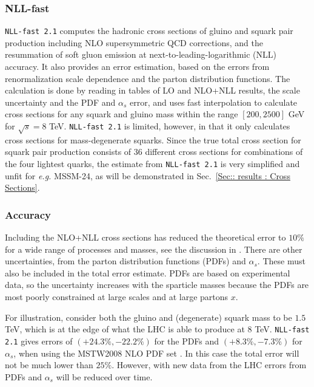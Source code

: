 \documentclass[twoside,english]{uiofysmaster}
\begin{document}
{\subsubsection{NLL-fast}

\verb|NLL-fast 2.1| \cite{beenakker1997squark, kulesza2009threshold, kulesza2009soft, beenakker2009soft, beenakker2011squark} computes the hadronic cross sections of gluino and squark pair production including NLO supersymmetric QCD corrections, and the resummation of soft gluon emission at next-to-leading-logarithmic (NLL) accuracy. It also provides an error estimation, based on the errors from renormalization scale dependence and the parton distribution functions. The calculation is done by reading in tables of LO and NLO+NLL results, the scale uncertainty and the PDF and $\alpha_s$ error, and uses fast interpolation to calculate cross sections for any squark and gluino mass within the range $[200, 2500]$ GeV for $\sqrt{s}=8$ TeV. \verb|NLL-fast 2.1| is limited, however, in that it only calculates cross sections for mass-degenerate squarks. Since the true total cross section for squark pair production consists of 36 different cross sections for combinations of the four lightest quarks, the estimate from \verb|NLL-fast 2.1| is very simplified and unfit for \textit{e.g.} MSSM-24, as will be demonstrated in Sec.~\ref{Sec:: results : Cross Sections}.

\subsubsection{Accuracy}

Including the NLO+NLL cross sections has reduced the theoretical error to $10 \%$ for a wide range of processes and masses, see the discussion in \cite{balazs2017colliderbit}. There are other uncertainties, from the parton distribution functions (PDFs) and $\alpha_s$. These must also be included in the total error estimate. PDFs are based on experimental data, so the uncertainty increases with the sparticle masses because the PDFs are most poorly constrained at large scales and at large partons $x$.

For illustration, consider both the gluino and (degenerate) squark mass to be $1.5$ TeV, which is at the edge of what the LHC is able to produce at 8 TeV. \verb|NLL-fast 2.1| gives errors of $(+24.3 \%, -22.2\%)$ for the PDFs and $(+8.3 \%, -7.3 \%)$ for $\alpha_s$, when using the MSTW2008 NLO PDF
set \cite{Martin:2009iq}. In this case the total error will not be much lower than $25 \%$. However, with new data from the LHC errors from PDFs and $\alpha_s$ will be reduced over time.

}
\end{document}

